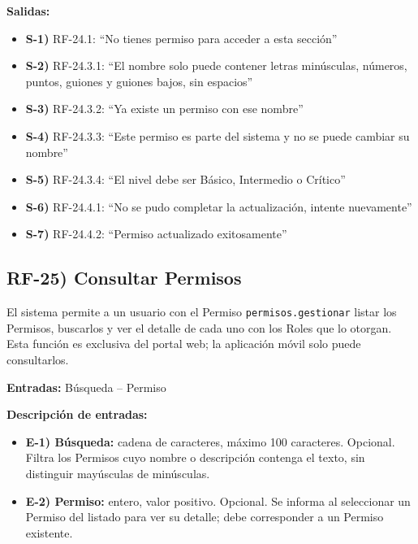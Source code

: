 \textbf{Salidas:}
\begin{itemize}[label={}, leftmargin=1.5em]
  \item \textbf{S-1)} RF-24.1: ``No tienes permiso para acceder a esta secci\'on''
  \item \textbf{S-2)} RF-24.3.1: ``El nombre solo puede contener letras min\'usculas, n\'umeros, puntos, guiones y guiones bajos, sin espacios''
  \item \textbf{S-3)} RF-24.3.2: ``Ya existe un permiso con ese nombre''
  \item \textbf{S-4)} RF-24.3.3: ``Este permiso es parte del sistema y no se puede cambiar su nombre''
  \item \textbf{S-5)} RF-24.3.4: ``El nivel debe ser B\'asico, Intermedio o Cr\'itico''
  \item \textbf{S-6)} RF-24.4.1: ``No se pudo completar la actualizaci\'on, intente nuevamente''
  \item \textbf{S-7)} RF-24.4.2: ``Permiso actualizado exitosamente''
\end{itemize}

\subsection*{RF-25) Consultar Permisos}
El sistema permite a un usuario con el Permiso \texttt{permisos.gestionar} listar los Permisos, buscarlos y ver el detalle de cada uno con los Roles que lo otorgan. Esta funci\'on es exclusiva del portal web; la aplicaci\'on m\'ovil solo puede consultarlos.

\textbf{Entradas:} B\'usqueda -- Permiso

\textbf{Descripci\'on de entradas:}
\begin{itemize}[label={}, leftmargin=1.5em]
  \item \textbf{E-1) B\'usqueda:} cadena de caracteres, m\'aximo 100 caracteres. Opcional. Filtra los Permisos cuyo nombre o descripci\'on contenga el texto, sin distinguir may\'usculas de min\'usculas.
  \item \textbf{E-2) Permiso:} entero, valor positivo. Opcional. Se informa al seleccionar un Permiso del listado para ver su detalle; debe corresponder a un Permiso existente.
\end{itemize}

